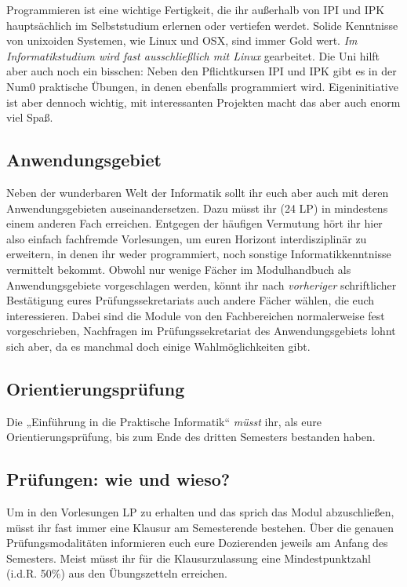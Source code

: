 Programmieren ist eine wichtige Fertigkeit, die ihr außerhalb von IPI und IPK hauptsächlich im Selbststudium erlernen oder vertiefen werdet. Solide Kenntnisse von unixoiden Systemen, wie Linux und OSX, sind immer Gold wert. \emph{Im Informatikstudium wird fast ausschließlich mit Linux} gearbeitet. Die Uni hilft aber auch noch ein bisschen: Neben den Pflichtkursen IPI und IPK gibt es in der Num0 praktische Übungen, in denen ebenfalls programmiert wird. Eigeninitiative ist aber dennoch wichtig, mit interessanten Projekten macht das aber auch enorm viel Spaß.


\subsection{Anwendungsgebiet}

Neben der wunderbaren Welt der Informatik sollt ihr euch aber auch mit deren Anwendungsgebieten auseinandersetzen. Dazu müsst ihr (24 \gls{LP}) in mindestens einem anderen Fach erreichen. Entgegen der häufigen Vermutung hört ihr hier also einfach fachfremde Vorlesungen, um euren Horizont interdisziplinär zu erweitern, in denen ihr weder programmiert, noch sonstige Informatikkenntnisse vermittelt bekommt. Obwohl nur wenige Fächer im Modulhandbuch als Anwendungsgebiete vorgeschlagen werden, könnt ihr nach \emph{vorheriger} schriftlicher Bestätigung eures Prüfungssekretariats auch andere Fächer wählen, die euch interessieren. Dabei sind die Module von den Fachbereichen normalerweise fest vorgeschrieben, Nachfragen im Prüfungssekretariat des Anwendungsgebiets lohnt sich aber, da es manchmal doch einige Wahlmöglichkeiten gibt.


\subsection{Orientierungsprüfung}

Die „Einführung in die Praktische Informatik“ \emph{müsst} ihr, als eure Orientierungsprüfung, bis zum Ende des dritten Semesters bestanden haben.


\subsection{Prüfungen: wie und wieso?}

Um in den Vorlesungen \gls{LP} zu erhalten und das sprich das Modul abzuschließen, müsst ihr fast immer eine Klausur am Semesterende bestehen. Über die genauen Prüfungsmodalitäten informieren euch eure Dozierenden jeweils am Anfang des Semesters. Meist müsst ihr für die Klausurzulassung eine Mindestpunktzahl (i.d.R. 50\%) aus den Übungszetteln erreichen.

